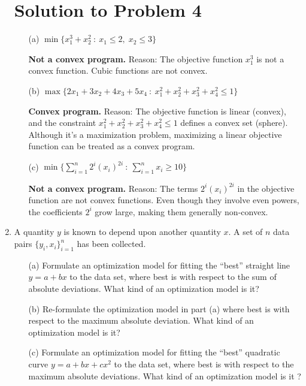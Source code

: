 \documentclass{article}
\begin{document}
\begin{enumerate}
\newpage

\section*{Solution to Problem 4}

\begin{enumerate}
\item[(a)] $\min\{x_1^3 + x_2^2 \ : \ x_1 \le 2, \; x_2 \le 3\}$

\textbf{Not a convex program.} Reason: The objective function $x_1^3$ is not a convex function. Cubic functions are not convex.

\item[(b)] $\max\{2x_1 + 3x_2 + 4x_3 + 5x_4 \ : \ x_1^2 + x_2^2 + x_3^2 + x_4^2 \le 1\}$

\textbf{Convex program.} Reason: The objective function is linear (convex), and the constraint $x_1^2 + x_2^2 + x_3^2 + x_4^2 \le 1$ defines a convex set (sphere). Although it's a maximization problem, maximizing a linear objective function can be treated as a convex program.

\item[(c)] $\min\{\sum_{i=1}^n 2^i (x_i)^{2i} \ : \ \sum_{i=1}^n x_i \ge 10\}$

\textbf{Not a convex program.} Reason: The terms $2^i (x_i)^{2i}$ in the objective function are not convex functions. Even though they involve even powers, the coefficients $2^i$ grow large, making them generally non-convex.
\end{enumerate}

\newpage

\item
A quantity $y$ is known to depend upon another quantity $x$. A set
of $n$ data pairs $\{y_i,x_i\}_{i=1}^n$ has been collected.
\begin{itemize}
\item[(a)] Formulate an optimization model for fitting the
``best'' straight line $y=a + bx$ to the data set, where best is
with respect to the sum of absolute deviations. What kind of an
optimization model is it?

\item[(b)] Re-formulate the optimization model in part (a) where
best is with respect to the maximum absolute deviation. What kind
of an optimization model is it?

\item[(c)] Formulate an optimization model for fitting the
``best'' quadratic curve $y=a + bx + cx^2$ to the data set, where
best is with respect to the maximum absolute deviations. What kind
of an optimization model is it ?
\end{itemize}


\end{enumerate}
\end{document}
